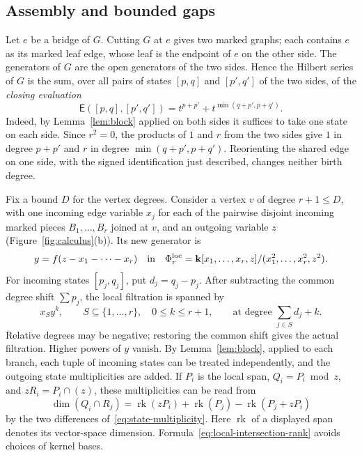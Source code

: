 \documentclass[reqno]{article}
\theoremstyle{plain} %
\theoremstyle{definition}
\theoremstyle{remark}
\DeclareMathOperator{\rank}{rk}
\newcommand{\K} {\mathbf{k}}
\numberwithin{equation}{section}
\begin{document}
\subsection{Assembly and bounded gaps}
\label{sec:boundary-assembly}

Let $e$ be a bridge of $G$. Cutting $G$ at $e$ gives two marked
graphs; each contains $e$ as its marked leaf edge, whose leaf is the
endpoint of $e$ on the other side. The generators of $G$ are the open
generators of the two sides. Hence the Hilbert series of $G$ is the sum,
over all pairs of states $[p,q]$ and $[p',q']$ of the two sides, of the
\emph{closing evaluation}
\begin{equation}\label{eq:edge-closing}
\mathsf E([p,q],[p',q'])
=t^{p+p'}+t^{\min(q+p',p+q')}.
\end{equation}
Indeed, by Lemma~\ref{lem:block} applied on both sides it suffices to
take one state on each side. Since $r^2=0$, the products of $1$ and $r$
from the two sides give $1$ in degree $p+p'$ and $r$ in degree
$\min(q+p',p+q')$. Reorienting the shared edge on one side, with the
signed identification just described, changes neither birth degree.


Fix a bound $D$ for the vertex degrees. Consider a vertex $v$ of degree
$r+1\le D$, with one incoming edge variable $x_j$ for each of the
pairwise disjoint incoming marked pieces $B_1,\ldots,B_r$ joined at $v$,
and an outgoing variable $z$
(Figure~\ref{fig:calculus}(b)). Its new generator is
\[
y=f(z-x_1-\cdots-x_r)
\quad\text{in}\quad
\Phi^{\rm loc}_r=\K[x_1,\ldots,x_r,z]/(x_1^2,\ldots,x_r^2,z^2).
\]
For incoming states $[p_j,q_j]$, put $d_j=q_j-p_j$.
After subtracting the common degree shift $\sum p_j$, the local
filtration is spanned by
\begin{equation}\label{eq:branch-local-columns}
x_Sy^k,\qquad S\subseteq\{1,\ldots,r\},\quad 0\le k\le r+1,
\qquad\text{at degree }\sum_{j\in S}d_j+k.
\end{equation}
Relative degrees may be negative; restoring the common shift gives the
actual filtration. Higher powers of $y$ vanish.
By Lemma~\ref{lem:block}, applied to each branch, each tuple of incoming
states can be treated independently, and the outgoing state
multiplicities are added.
If $P_i$ is the local span, $Q_i=P_i\bmod z$, and $zR_i=P_i\cap(z)$,
these multiplicities can be read from
\begin{equation}\label{eq:local-intersection-rank}
\dim(Q_i\cap R_j)
=\rank(zP_i)+\rank(P_j)-\rank(P_j+zP_i)
\end{equation}
by the two differences of~\eqref{eq:state-multiplicity}.
Here $\rank$ of a displayed span denotes its vector-space dimension.
Formula~\eqref{eq:local-intersection-rank} avoids choices of kernel bases.
\end{document}
